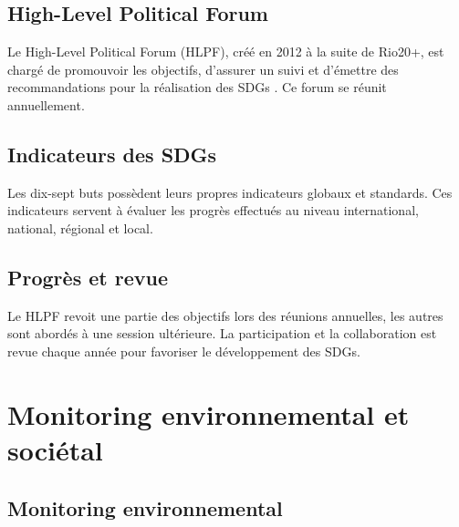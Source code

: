 \documentclass[10pt, conference, compsocconf]{llncs}
\begin{document}
	\subsection{High-Level Political Forum}
		Le High-Level Political Forum (HLPF), créé en 2012 à la suite de Rio20+, est chargé de promouvoir les objectifs, d'assurer un suivi et d'émettre des recommandations pour la réalisation des SDGs \cite{united_nations_high-level_nodate}. Ce forum se réunit annuellement.
	
	\subsection{Indicateurs des SDGs}
		Les dix-sept buts possèdent leurs propres indicateurs globaux et standards. Ces indicateurs servent à évaluer les progrès effectués au niveau international, national, régional et local.		
				
	\subsection{Progrès et revue}
		Le HLPF revoit une partie des objectifs lors des réunions annuelles, les autres sont abordés à une session ultérieure. La participation et la collaboration est revue chaque année pour favoriser le développement des SDGs.

\section{Monitoring environnemental et sociétal}
	\subsection{Monitoring environnemental}
\end{document}

